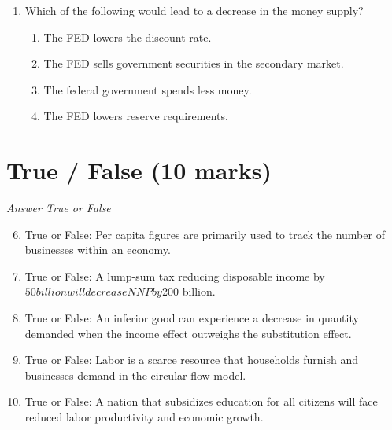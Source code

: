 \documentclass[12pt]{article}
\begin{document}
\begin{enumerate}[label=\arabic*.]
\begin{enumerate}[label=(\alph*)]
    \item It will be located in the middle of the equilibrium price.
    \item It will be located below the equilibrium price.
    \item It will be located above the equilibrium price.
    \item It will be located above the market price.
    \item It is used when the equilibrium price is too high.
\end{enumerate}
\item Which of the following would lead to a decrease in the money supply?
\begin{enumerate}[label=(\alph*)]
    \item The FED lowers the discount rate.
    \item The FED sells government securities in the secondary market.
    \item The federal government spends less money.
    \item The FED lowers reserve requirements.
\end{enumerate}
\end{enumerate}

\section*{True / False (10 marks)}
\textit{Answer True or False}
\begin{enumerate}[label=\arabic*.]
\setcounter{enumi}{5}
\item True or False: Per capita figures are primarily used to track the number of businesses within an economy.
\item True or False: A lump-sum tax reducing disposable income by $50 billion will decrease NNP by $200 billion.
\item True or False: An inferior good can experience a decrease in quantity demanded when the income effect outweighs the substitution effect.
\item True or False: Labor is a scarce resource that households furnish and businesses demand in the circular flow model.
\item True or False: A nation that subsidizes education for all citizens will face reduced labor productivity and economic growth.
\end{enumerate}
\end{document}
